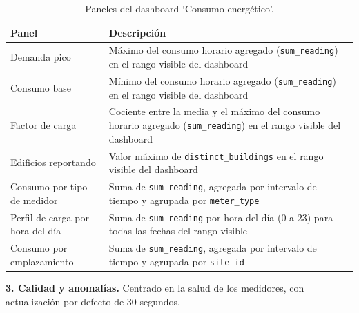 \begin{table}[H]
  \centering
  \begin{tabular}{|p{4.5cm}|p{9cm}|}
    \hline
    \textbf{Panel} & \textbf{Descripción} \\ \hline
    Demanda pico & Máximo del consumo horario agregado (\texttt{sum\_reading}) en el rango visible del dashboard \\ \hline
    Consumo base & Mínimo del consumo horario agregado (\texttt{sum\_reading}) en el rango visible del dashboard \\ \hline
    Factor de carga & Cociente entre la media y el máximo del consumo horario agregado (\texttt{sum\_reading}) en el rango visible del dashboard \\ \hline
    Edificios reportando & Valor máximo de \texttt{distinct\_buildings} en el rango visible del dashboard \\ \hline
    Consumo por tipo de medidor & Suma de \texttt{sum\_reading}, agregada por intervalo de tiempo y agrupada por \texttt{meter\_type} \\ \hline
    Perfil de carga por hora del día & Suma de \texttt{sum\_reading} por hora del día (0 a 23) para todas las fechas del rango visible \\ \hline
    Consumo por emplazamiento & Suma de \texttt{sum\_reading}, agregada por intervalo de tiempo y agrupada por \texttt{site\_id} \\ \hline
  \end{tabular}
  \caption{Paneles del dashboard `Consumo energético'.}
  \label{tab:grafana-consumo}
\end{table}

\textbf{3. Calidad y anomalías.} Centrado en la salud de los medidores, con actualización por defecto de 30 segundos.

